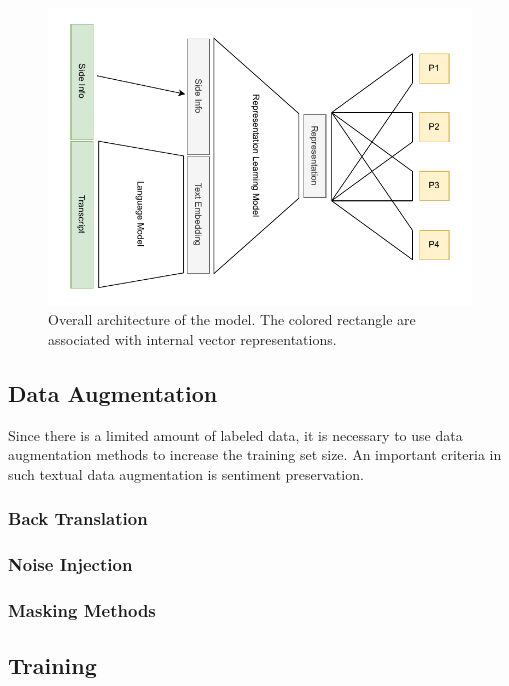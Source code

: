 \documentclass[10pt,conference,compsocconf]{IEEEtran}
\begin{document}
\begin{figure}[ht]
    \centering
    \includegraphics[width=1\linewidth]{assets/model_arch.pdf}
    \caption{Overall architecture of the model. The colored rectangle are associated with internal vector representations.}
    \label{fig:model_arch}
\end{figure}

\subsection{Data Augmentation}\label{sec: Data Augmentation}

Since there is a limited amount of labeled data, it is necessary to use data augmentation methods to increase the training set size. An important criteria in such textual data augmentation is sentiment preservation.

\subsubsection{Back Translation}\label{sec: Back Translation}

\subsubsection{Noise Injection}\label{sec: Noise Injection}

\subsubsection{Masking Methods}\label{sec: Masking Methods}

\subsection{Training}\label{sec: Training}
\end{document}
